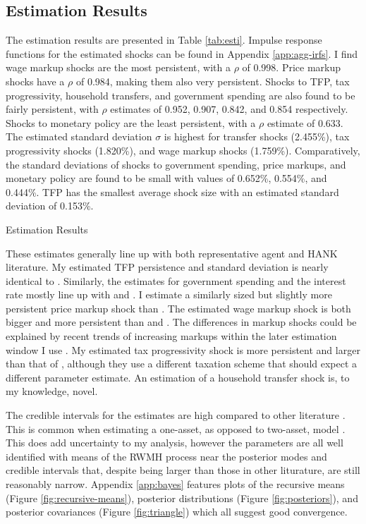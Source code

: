 \subsection{Estimation Results}

The estimation results are presented in Table \ref{tab:esti}. Impulse response functions for the estimated shocks can be found in Appendix \ref{app:agg-irfs}. I find wage markup shocks are the most persistent, with a $\rho$ of 0.998. Price markup shocks have a $\rho$ of 0.984, making them also very persistent. Shocks to TFP, tax progressivity, household transfers, and government spending are also found to be fairly persistent, with $\rho$ estimates of 0.952, 0.907, 0.842, and 0.854 respectively. Shocks to monetary policy are the least persistent, with a $\rho$ estimate of 0.633. The estimated standard deviation $\sigma$ is highest for transfer shocks (2.455\%), tax progressivity shocks (1.820\%), and wage markup shocks (1.759\%). Comparatively, the standard deviations of shocks to government spending, price markups, and monetary policy are found to be small with values of 0.652\%, 0.554\%, and 0.444\%. TFP has the smallest average shock size with an estimated standard deviation of 0.153\%.

\begin{table}[t]
    \centering
    \caption{Estimation Results}
    
    \label{tab:esti}
\end{table}

These estimates generally line up with both representative agent and HANK literature. My estimated TFP persistence and standard deviation is nearly identical to \textcite{bayer2024shocks}. Similarly, the estimates for government spending and the interest rate mostly line up with \textcite{bayer2024shocks} and \textcite{smets2007shocks}. I estimate a similarly sized but slightly more persistent price markup shock than \textcite{bayer2024shocks}. The estimated wage markup shock is both bigger and more persistent than \textcite{smets2007shocks} and \textcite{bayer2024shocks}. The differences in markup shocks could be explained by recent trends of increasing markups within the later estimation window I use \autocite{de2020rise}. My estimated tax progressivity shock is more persistent and larger than that of \textcite{bayer2024shocks}, although they use a different taxation scheme that should expect a different parameter estimate. An estimation of a household transfer shock is, to my knowledge, novel.

The credible intervals for the estimates are high compared to other literature \autocites{smets2007shocks}{bayer2024shocks}. This is common when estimating a one-asset, as opposed to two-asset, model \autocite{auclert2021using}. This does add uncertainty to my analysis, however the parameters are all well identified with means of the RWMH process near the posterior modes and credible intervals that, despite being larger than those in other liturature, are still reasonably narrow. Appendix \ref{app:bayes} features plots of the recursive means (Figure \ref{fig:recursive-means}), posterior distributions (Figure \ref{fig:posteriors}), and posterior covariances (Figure \ref{fig:triangle}) which all suggest good convergence.
